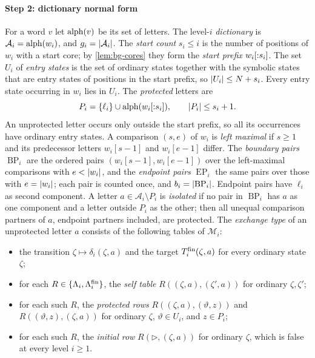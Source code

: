 \paragraph{Step 2: dictionary normal form}
For a word $v$ let $\operatorname{alph}(v)$ be its set of letters. The level-$i$
\emph{dictionary} is $\mathcal A_i=\operatorname{alph}(w_i)$, and $g_i=\lvert \mathcal A_i\rvert$.
The \emph{start count} $s_i\le i$ is the number of positions of $w_i$ with a
start core; by \cref{lem:bg-cores} they form the \emph{start prefix}
$w_i[{:}s_i]$. The set $U_i$ of \emph{entry states} is the set of ordinary
states together with the symbolic states that are entry states of positions in
the start prefix, so $\lvert U_i\rvert\le N+s_i$. Every entry state occurring in $w_i$
lies in $U_i$. The \emph{protected} letters are
\[
 P_i=\{\ell_i\}\cup\operatorname{alph}(w_i[{:}s_i]),\qquad\lvert P_i\rvert\le s_i+1 .
\]
An unprotected letter occurs only outside the start prefix, so all its
occurrences have ordinary entry states. A comparison $(s,e)$ of $w_i$ is
\emph{left maximal} if $s\ge1$ and its predecessor letters $w_i[s-1]$ and
$w_i[e-1]$ differ. The \emph{boundary pairs} $\operatorname{BP}_i$ are the
ordered pairs $(w_i[s-1],w_i[e-1])$ over the left-maximal comparisons with
$e<\lvert w_i\rvert$, and the \emph{endpoint pairs} $\operatorname{EP}_i$ the same
pairs over those with $e=\lvert w_i\rvert$; each pair is counted once, and
$b_i=\lvert \operatorname{BP}_i\rvert$. Endpoint pairs have $\ell_i$ as second
component. A letter $a\in\mathcal A_i\setminus P_i$ is \emph{isolated} if no pair
in $\operatorname{BP}_i$ has $a$ as one component and a letter outside $P_i$ as
the other; then all unequal comparison partners of $a$, endpoint partners
included, are protected. The \emph{exchange type} of an unprotected letter $a$
consists of the following tables of $\mathcal M_i$:
\begin{itemize}[leftmargin=*]
\item the transition $\zeta\mapsto\delta_i(\zeta,a)$ and the target
  $T^{\mathrm{fin}}_i(\zeta,a)$ for every ordinary state $\zeta$;
\item for each $R\in\{\Lambda_i,\Lambda^{\mathrm{fin}}_i\}$, the \emph{self table}
  $R((\zeta,a),(\zeta',a))$ for ordinary $\zeta,\zeta'$;
\item for each such $R$, the \emph{protected rows} $R((\zeta,a),(\vartheta,z))$
  and $R((\vartheta,z),(\zeta,a))$ for ordinary $\zeta$, $\vartheta\in U_i$, and
  $z\in P_i$;
\item for each such $R$, the \emph{initial row} $R(\triangleright,(\zeta,a))$
  for ordinary $\zeta$, which is false at every level $i\ge1$.
\end{itemize}

